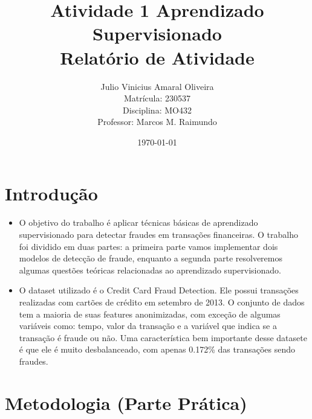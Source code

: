 \documentclass[conference]{IEEEtran}
\title{Atividade 1 Aprendizado Supervisionado \\ \large Relatório de Atividade}
\author{Julio Vinicius Amaral Oliveira \\ Matrícula: 230537 \\ Disciplina: MO432 \\ Professor: Marcos M. Raimundo}
\date{\today}
\begin{document}
\maketitle
\thispagestyle{empty}

\newpage
\tableofcontents
\thispagestyle{empty}

\newpage
{}

\section{Introdução}
\label{sec:introducao}
\begin{itemize}
  \item O objetivo do trabalho é aplicar técnicas básicas de aprendizado supervisionado para detectar fraudes em transações financeiras. O trabalho foi dividido em duas partes: a primeira parte vamos implementar dois modelos de detecção de fraude, enquanto a segunda parte resolveremos algumas questões teóricas relacionadas ao aprendizado supervisionado.
  \item O dataset utilizado é o Credit Card Fraud Detection. Ele possui transações realizadas com cartões de crédito em setembro de 2013. O conjunto de dados tem a maioria de suas features anonimizadas, com exceção de algumas variáveis como: tempo, valor da transação e a variável que indica se a transação é fraude ou não. Uma característica bem importante desse datasete é que ele é muito desbalanceado, com apenas 0.172\% das transações sendo fraudes.
\end{itemize}

\section{Metodologia (Parte Prática)}
\label{sec:metodologia}
\end{document}
